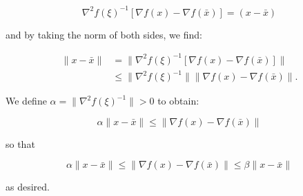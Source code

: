 \begin{solution}
    $$
    \nabla^2 f(\xi)^{-1} \left[\nabla f(x) - \nabla f(\bar{x}) \right] = (x - \bar{x})
    $$

    and by taking the norm of both sides, we find:

    \begin{align*}
         \lVert x - \bar{x} \rVert &= \lVert \nabla^2 f(\xi)^{-1} \left[\nabla f(x) - \nabla f(\bar{x})\right] \rVert \\
                                   &\le \lVert \nabla^2 f(\xi)^{-1} \rVert \lVert \nabla f(x) - \nabla f(\bar{x}) \rVert.
    \end{align*}

    \pagebreak
    We define $\alpha = \lVert \nabla^2 f(\xi)^{-1} \rVert > 0$ to obtain:

    $$
    \alpha \lVert x - \bar{x} \rVert \le \lVert \nabla f(x) - \nabla f(\bar{x}) \rVert
    $$

    so that 

    $$
    \alpha \lVert x - \bar{x} \rVert \le \lVert \nabla f(x) - \nabla f(\bar{x}) \rVert \le \beta \lVert x - \bar{x} \rVert 
    $$

    as desired.
    \ \\
\end{solution}
